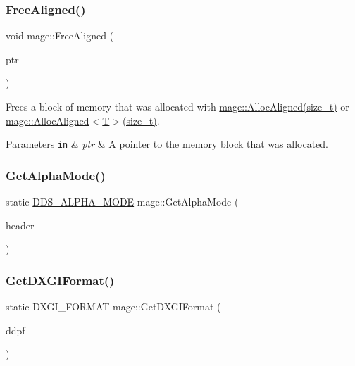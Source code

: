 \subsubsection{\texorpdfstring{Free\+Aligned()}{FreeAligned()}}
{\footnotesize\ttfamily void mage\+::\+Free\+Aligned (\begin{DoxyParamCaption}\item[{void $\ast$}]{ptr }\end{DoxyParamCaption})}

Frees a block of memory that was allocated with \hyperlink{namespacemage_a6c97f75df305a5e0a945e82a26e75c38}{mage\+::\+Alloc\+Aligned(size\+\_\+t)} or \hyperlink{namespacemage_a6c97f75df305a5e0a945e82a26e75c38}{mage\+::\+Alloc\+Aligned$<$\+T$>$(size\+\_\+t)}.


\begin{DoxyParams}[1]{Parameters}
\mbox{\tt in}  & {\em ptr} & A pointer to the memory block that was allocated. \\
\hline
\end{DoxyParams}
\hypertarget{namespacemage_afcc0891e1660f8457696cb30f4ee518a}{}\label{namespacemage_afcc0891e1660f8457696cb30f4ee518a} 
\subsubsection{\texorpdfstring{Get\+Alpha\+Mode()}{GetAlphaMode()}}
{\footnotesize\ttfamily static \hyperlink{namespacemage_a0c586a2bad862f4858900ca121ca80c2}{D\+D\+S\+\_\+\+A\+L\+P\+H\+A\+\_\+\+M\+O\+DE} mage\+::\+Get\+Alpha\+Mode (\begin{DoxyParamCaption}\item[{\+\_\+\+In\+\_\+ const \hyperlink{structmage_1_1_d_d_s___h_e_a_d_e_r}{D\+D\+S\+\_\+\+H\+E\+A\+D\+ER} $\ast$}]{header }\end{DoxyParamCaption})\hspace{0.3cm}{\ttfamily [static]}}

\hypertarget{namespacemage_a4fecf9823aec7c5ba078acf6bd73f983}{}\label{namespacemage_a4fecf9823aec7c5ba078acf6bd73f983} 
\subsubsection{\texorpdfstring{Get\+D\+X\+G\+I\+Format()}{GetDXGIFormat()}}
{\footnotesize\ttfamily static D\+X\+G\+I\+\_\+\+F\+O\+R\+M\+AT mage\+::\+Get\+D\+X\+G\+I\+Format (\begin{DoxyParamCaption}\item[{const \hyperlink{structmage_1_1_d_d_s___p_i_x_e_l_f_o_r_m_a_t}{D\+D\+S\+\_\+\+P\+I\+X\+E\+L\+F\+O\+R\+M\+AT} \&}]{ddpf }\end{DoxyParamCaption})\hspace{0.3cm}{\ttfamily [static]}}

